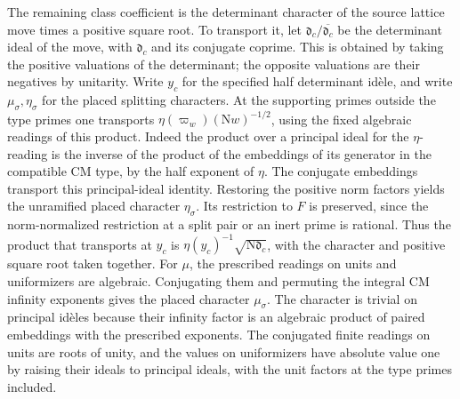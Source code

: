 The remaining class coefficient is the determinant
character of the source lattice move times a positive
square root. To transport it, let
\(\mathfrak d_c/\overline{\mathfrak d_c}\) be the determinant
ideal of the move, with \(\mathfrak d_c\) and its conjugate
coprime. This is obtained by taking the positive
valuations of the determinant; the opposite valuations
are their negatives by unitarity. Write \(y_c\) for the
specified half determinant id\`ele, and write
\(\mu_\sigma,\eta_\sigma\) for the placed splitting
characters. At the supporting primes outside the type
primes one transports
\(\eta(\varpi_w)(\mathrm Nw)^{-1/2}\), using the
fixed algebraic readings of this product. Indeed the
product over a principal ideal for the \(\eta\)-reading
is the inverse of the product of the embeddings of its
generator in the compatible CM type, by the half
exponent of \(\eta\). The conjugate embeddings transport
this principal-ideal identity. Restoring the positive
norm factors yields the unramified placed character
\(\eta_\sigma\). Its restriction to \(F\) is preserved,
since the norm-normalized restriction at a split pair
or an inert prime is rational. Thus the product that
transports at \(y_c\) is
\(\eta(y_c)^{-1}\sqrt{\mathrm N\mathfrak d_c}\), with
the character and positive square root taken together.
For \(\mu\), the prescribed readings on units and
uniformizers are algebraic. Conjugating them and
permuting the integral CM infinity exponents gives
the placed character \(\mu_\sigma\). The character is
trivial on principal id\`eles because their infinity
factor is an algebraic product of paired embeddings
with the prescribed exponents. The conjugated
finite readings on units are roots of unity, and
the values on uniformizers have absolute value one
by raising their ideals to principal ideals, with
the unit factors at the type primes included.

